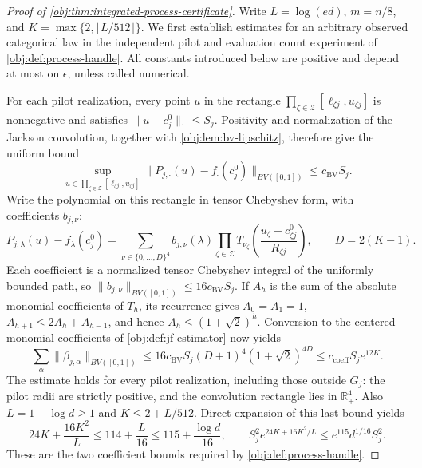 \documentclass[11pt]{article}
\begin{document}
\begin{proof}[Proof of \cref{obj:thm:integrated-process-certificate}]
Write \(L=\log(ed)\), \(m=n/8\), and \(K=\max\{2,\lfloor L/512\rfloor\}\). We first establish estimates for an arbitrary observed categorical law in the independent pilot and evaluation count experiment of \cref{obj:def:process-handle}. All constants introduced below are positive and depend at most on \(\epsilon\), unless called numerical.

For each pilot realization, every point \(u\) in the rectangle \(\prod_{\zeta\in\mathcal Z}[\ell_{\zeta j},u_{\zeta j}]\) is nonnegative and satisfies \(\|u-c_j^0\|_1\leq S_j\). Positivity and normalization of the Jackson convolution, together with \cref{obj:lem:bv-lipschitz}, therefore give the uniform bound
\[
\sup_{u\in\prod_{\zeta\in\mathcal Z}[\ell_{\zeta j},u_{\zeta j}]}
\|P_{j,\cdot}(u)-f_\cdot(c_j^0)\|_{BV([0,1])}
\leq c_{\mathrm{BV}}S_j.
\]
Write the polynomial on this rectangle in tensor Chebyshev form, with coefficients \(b_{j,\nu}\):
\[
P_{j,\lambda}(u)-f_\lambda(c_j^0)
 =\sum_{\nu\in\{0,\ldots,D\}^4}b_{j,\nu}(\lambda)
   \prod_{\zeta\in\mathcal Z}
   T_{\nu_\zeta}\!\left(\frac{u_\zeta-c^0_{\zeta j}}{R_{\zeta j}}\right),
\qquad D=2(K-1).
\]
Each coefficient is a normalized tensor Chebyshev integral of the uniformly bounded path, so \(\|b_{j,\nu}\|_{BV([0,1])}\leq16c_{\mathrm{BV}}S_j\). If \(A_h\) is the sum of the absolute monomial coefficients of \(T_h\), its recurrence gives \(A_0=A_1=1\), \(A_{h+1}\leq2A_h+A_{h-1}\), and hence \(A_h\leq(1+\sqrt2)^h\). Conversion to the centered monomial coefficients of \cref{obj:def:jf-estimator} now yields
\[
\sum_\alpha\|\beta_{j,\alpha}\|_{BV([0,1])}
 \leq16c_{\mathrm{BV}}S_j(D+1)^4(1+\sqrt2)^{4D}
 \leq c_{\mathrm{coeff}}S_j e^{12K}.
\]
The estimate holds for every pilot realization, including those outside \(G_j\): the pilot radii are strictly positive, and the convolution rectangle lies in \(\mathbb R_+^4\). Also \(L=1+\log d\geq1\) and \(K\leq2+L/512\). Direct expansion of this last bound yields
\[
24K+\frac{16K^2}{L}\leq114+\frac L{16}
 \leq115+\frac{\log d}{16},
\qquad
S_j^2e^{24K+16K^2/L}\leq e^{115}d^{1/16}S_j^2.
\]
These are the two coefficient bounds required by \cref{obj:def:process-handle}. %


\end{proof}
\end{document}
